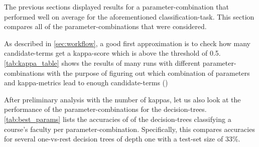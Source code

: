 The previous sections displayed results for a parameter-combination that performed well on average for the aforementioned classification-task. This section compares all of the parameter-combinations that were considered. 

As described in \autoref{sec:workflow}, a good first approximation is to check how many candidate-terms get a kappa-score which is above the threshold of 0.5. \autoref{tab:kappa_table} shows the results of many runs with different parameter-combinations with the purpose of figuring out which combination of parameters and kappa-metrics lead to enough candidate-terms ()




After preliminary analysis with the number of kappas, let us also look at the performance of the parameter-combinations for the decision-trees. \autoref{tab:best_params} lists the accuracies of of the decision-trees classifying a course's faculty per parameter-combination. Specifically, this compares accuracies for several one-vs-rest decision trees of depth one with a test-set size of 33\%.


\newcommand{\SmfauhcsdT}{\setlength\extrarowheight{-5pt} \scriptsize \mfauhcsdT}
\newcommand{\Smfauhtcsldp}{\setlength\extrarowheight{-5pt} \scriptsize \mfauhtcsldp}

